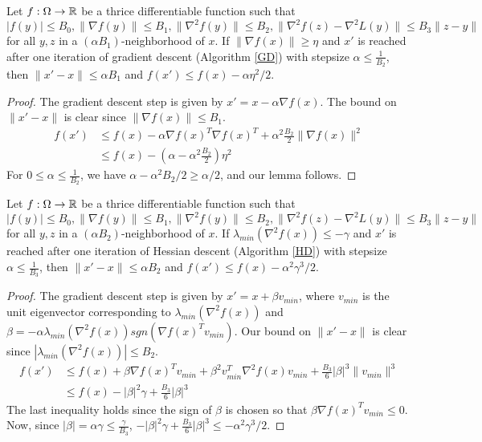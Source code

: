 \begin{lemma}\label{GradDecrease}		
Let $f :\Omega \to {\mathbb{R}}$ be a thrice differentiable function such that $|f(y)| \leq B_0, \|\nabla f(y)\| \leq B_1, \|\nabla^2 f(y)\| \leq B_2,\|\nabla^2f (z)-\nabla^2L(y)\| \leq B_3\|z - y\|$ for all $y,z$ in a $(\alpha B_1)$-neighborhood of $x$. If $\|\nabla f (x) \|\geq \eta$ and $x'$ is reached after one iteration of gradient descent (Algorithm \ref{GD}) with stepsize $\alpha \leq \frac{1}{B_2}$, then $\|x' - x\| \leq \alpha B_1$ and $f(x') \leq f(x) - \alpha\eta^2/2$.
\end{lemma} 

\begin{proof}
The gradient descent step is given by $x' = x - \alpha \nabla f(x)$. The bound on $\|x' - x\|$ is clear since $\|\nabla f(x) \| \leq B_1$.
\begin{align*}
f(x') &\leq f(x) - \alpha \nabla f(x)^T\nabla f(x)^T + \alpha^2\frac{B_2}{2} \|\nabla f(x)\|^2 \\
&\leq f(x) - (\alpha - \alpha^2 \frac{B_2}{2}) \eta^2 
\end{align*}
For $0 \leq \alpha \leq \frac{1}{B_2}$, we have $\alpha - \alpha^2B_2/2 \geq \alpha/2$, and our lemma follows.
\end{proof}

\begin{lemma}\label{HessianDecrease}
Let $f :\Omega \to {\mathbb{R}}$ be a thrice differentiable function such that $|f(y)| \leq B_0, \|\nabla f(y)\| \leq B_1, \|\nabla^2 f(y)\| \leq B_2,\|\nabla^2f (z)-\nabla^2L(y)\| \leq B_3\|z - y\|$ for all $y,z$ in a $(\alpha B_2)$-neighborhood of $x$. If $\lambda_{min}(\nabla^2 f (x)) \leq -\gamma$ and $x'$ is reached after one iteration of Hessian descent (Algorithm \ref{HD}) with stepsize $\alpha \leq \frac{1}{B_3}$, then $\|x' - x\| \leq \alpha B_2$ and $f(x') \leq f(x) - \alpha^2 \gamma^3/2$.
\end{lemma}

\begin{proof}
The gradient descent step is given by $x' = x + \beta v_{min}$, where $v_{min}$ is the unit eigenvector corresponding to $\lambda_{min}(\nabla^2f(x))$ and $\beta = -\alpha\lambda_{min}(\nabla^2 f(x))sgn(\nabla f(x)^Tv_{min})$. Our bound on $\|x' - x\|$ is clear since $|\lambda_{min}(\nabla^2 f(x))| \leq B_2$.
\begin{align*}
f(x') &\leq f(x) + \beta\nabla f(x)^Tv_{min} + \beta^2 v_{min}^T\nabla^2f(x)v_{min} + \frac{B_3}{6} |\beta|^3 \|v_{min}\|^3 \\
&\leq f(x) - |\beta|^2 \gamma + \frac{B_3}{6} |\beta|^3
\end{align*}
The last inequality holds since the sign of $\beta$ is chosen so that $\beta \nabla f(x)^Tv_{min} \leq 0$. Now, since $|\beta| = \alpha \gamma \leq \frac{\gamma}{B_3}$, $-|\beta|^2\gamma + \frac{B_3}{6} |\beta|^3 \leq - \alpha^2 \gamma^3/2$. 
\end{proof}


